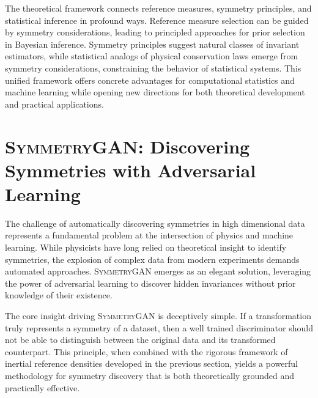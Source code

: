         The theoretical framework connects reference measures, symmetry principles, and statistical inference in profound ways.
        Reference measure selection can be guided by symmetry considerations, leading to principled approaches for prior selection in Bayesian inference. 
        Symmetry principles suggest natural classes of invariant estimators, while statistical analogs of physical conservation laws emerge from symmetry considerations, constraining the behavior of statistical systems.
        This unified framework offers concrete advantages for computational statistics and machine learning while opening new directions for both theoretical development and practical applications.

\section{\textsc{SymmetryGAN}: Discovering Symmetries with Adversarial Learning}
\label{sec:symmetry-gan-main}
The challenge of automatically discovering symmetries in high dimensional data represents a fundamental problem at the intersection of physics and machine learning.
%
While physicists have long relied on theoretical insight to identify symmetries, the explosion of complex data from modern experiments demands automated approaches.
%
\textsc{SymmetryGAN} emerges as an elegant solution, leveraging the power of adversarial learning to discover hidden invariances without prior knowledge of their existence.

The core insight driving \textsc{SymmetryGAN} is deceptively simple.
%
If a transformation truly represents a symmetry of a dataset, then a well trained discriminator should not be able to distinguish between the original data and its transformed counterpart.
%
This principle, when combined with the rigorous framework of inertial reference densities developed in the previous section, yields a powerful methodology for symmetry discovery that is both theoretically grounded and practically effective.
